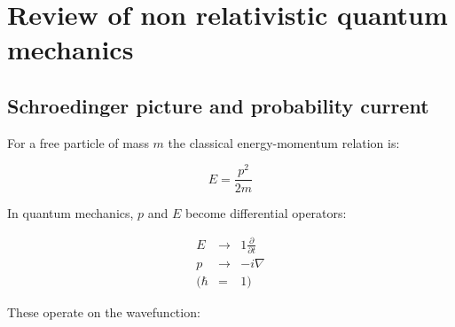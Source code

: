 
\chapter{Review of non relativistic quantum mechanics}

\section{Schroedinger picture and probability current}

For a free particle of mass $m$ the classical energy-momentum relation is:

\[
  E = \frac{p^2}{2m}
\]

In quantum mechanics, $p$ and $E$ become differential operators:

\begin{eqnarray*}
  E & \to & 1\frac{\partial}{\partial t} \\
  p & \to & -i \nabla \\
  ( \hbar & = & 1 )
\end{eqnarray*}

These operate on the wavefunction:

